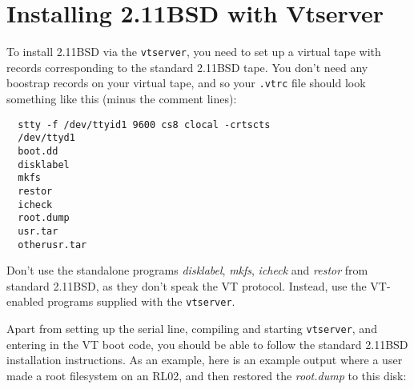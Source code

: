 \section{Installing 2.11BSD with Vtserver}

To install 2.11BSD via the {\tt vtserver}, you need to set up a virtual
tape with records corresponding to the standard 2.11BSD tape. You don't
need any boostrap records on your virtual tape, and so your {\tt .vtrc}
file should look something like this (minus the comment lines):

\begin{verbatim}
  stty -f /dev/ttyid1 9600 cs8 clocal -crtscts
  /dev/ttyd1
  boot.dd
  disklabel
  mkfs
  restor
  icheck
  root.dump
  usr.tar
  otherusr.tar
\end{verbatim}

Don't use the standalone programs {\it disklabel},
{\it mkfs}, {\it icheck} and {\it restor} from standard 2.11BSD, as they
don't speak the VT protocol. Instead, use the VT-enabled programs supplied
with the {\tt vtserver}.

Apart from setting up the serial line, compiling and starting {\tt vtserver},
and entering in the VT boot code, you should be able to follow the standard
2.11BSD installation instructions. As an example, here is an example output
where a user made a root filesystem on an RL02, and then restored the
{\it root.dump} to this disk:

